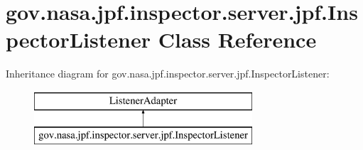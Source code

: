 \hypertarget{classgov_1_1nasa_1_1jpf_1_1inspector_1_1server_1_1jpf_1_1_inspector_listener}{}\section{gov.\+nasa.\+jpf.\+inspector.\+server.\+jpf.\+Inspector\+Listener Class Reference}
\label{classgov_1_1nasa_1_1jpf_1_1inspector_1_1server_1_1jpf_1_1_inspector_listener}
Inheritance diagram for gov.\+nasa.\+jpf.\+inspector.\+server.\+jpf.\+Inspector\+Listener\+:\begin{figure}[H]
\begin{center}
\leavevmode
\includegraphics[height=2.000000cm]{classgov_1_1nasa_1_1jpf_1_1inspector_1_1server_1_1jpf_1_1_inspector_listener}
\end{center}
\end{figure}
